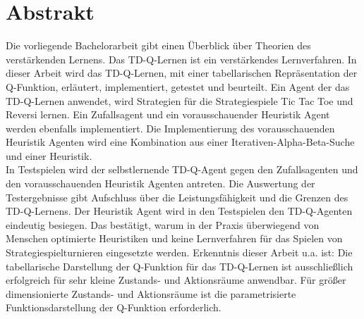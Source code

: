 \chapter*{Abstrakt}

Die vorliegende Bachelorarbeit gibt einen Überblick über Theorien des verstärkenden Lernens. Das TD-Q-Lernen ist ein verstärkendes Lernverfahren. 
In dieser Arbeit wird das TD-Q-Lernen, mit einer tabellarischen Repräsentation der Q-Funktion, erläutert, implementiert, getestet und beurteilt. 
Ein Agent der das TD-Q-Lernen anwendet, wird Strategien für die Strategiespiele Tic Tac Toe und Reversi lernen. 
Ein Zufallsagent und ein vorausschauender Heuristik Agent werden ebenfalls implementiert. Die Implementierung des vorausschauenden Heuristik Agenten wird eine Kombination aus einer Iterativen-Alpha-Beta-Suche und einer Heuristik. \\

In Testspielen wird der selbstlernende TD-Q-Agent gegen den Zufallsagenten und den vorausschauenden Heuristik Agenten antreten. Die Auswertung der Testergebnisse gibt Aufschluss über die Leistungsfähigkeit und die Grenzen des TD-Q-Lernens. 
Der Heuristik Agent wird in den Testspielen den TD-Q-Agenten eindeutig besiegen. Das bestätigt, warum in der Praxis überwiegend von Menschen optimierte Heuristiken und keine Lernverfahren für das Spielen von Strategiespielturnieren eingesetzte werden. 
Erkenntnis dieser Arbeit u.a. ist: Die tabellarische Darstellung der Q-Funktion für das TD-Q-Lernen ist ausschließlich erfolgreich für sehr kleine Zustands- und Aktionsräume anwendbar. Für größer dimensionierte Zustands- und Aktionsräume ist die parametrisierte Funktionsdarstellung der Q-Funktion erforderlich. 




